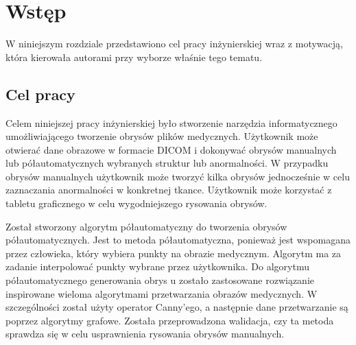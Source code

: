 \documentclass[a4paper,11pt,twoside,openright]{report}
\theoremstyle{definition}
\begin{document}
\thispagestyle{empty}
\newpage

\null\thispagestyle{empty}\newpage


\tableofcontents
\thispagestyle{empty}


\null\thispagestyle{empty}\newpage
\pagestyle{fancy}
\setcounter{page}{11} %

\chapter*{Wstęp}

W niniejszym rozdziale przedstawiono cel pracy inżynierskiej wraz z motywacją,
która kierowała autorami przy wyborze właśnie tego tematu.

\section*{Cel pracy}

Celem niniejszej pracy inżynierskiej było stworzenie narzędzia informatycznego
umożliwiającego tworzenie obrysów plików medycznych. Użytkownik może otwierać
dane obrazowe w formacie DICOM i dokonywać obrysów manualnych lub półautomatycznych
wybranych struktur lub anormalności. W przypadku obrysów manualnych użytkownik
może tworzyć kilka obrysów jednocześnie w celu zaznaczania anormalności w konkretnej tkance.
Użytkownik może korzystać z tabletu graficznego w celu wygodniejszego rysowania obrysów.

Został stworzony algorytm półautomatyczny do tworzenia obrysów półautomatycznych.
Jest to metoda półautomatyczna, ponieważ jest wspomagana przez człowieka, który
wybiera punkty na obrazie medycznym. Algorytm ma za zadanie interpolować punkty
wybrane przez użytkownika. Do algorytmu półautomatycznego generowania obrys
u zostało zastosowane rozwiązanie inspirowane wieloma algorytmami przetwarzania
obrazów medycznych. W szczególności został użyty operator Canny'ego, a następnie
dane przetwarzanie są poprzez algorytmy grafowe. Została przeprowadzona walidacja,
czy ta metoda sprawdza się w celu usprawnienia rysowania obrysów manualnych.
\end{document}
